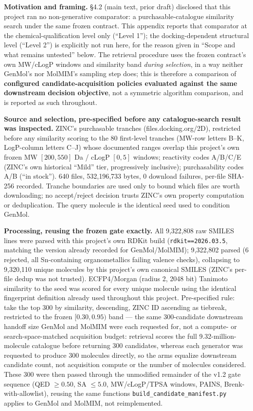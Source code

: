 \documentclass{article}
\begin{document}
\textbf{Motivation and framing.} \S4.2 (main text, prior draft) disclosed that this project ran no non-generative comparator: a purchasable-catalogue similarity search under the same frozen contract. This appendix reports that comparator at the chemical-qualification level only (``Level 1''); the docking-dependent structural level (``Level 2'') is explicitly not run here, for the reason given in ``Scope and what remains untested'' below. The retrieval procedure uses the frozen contract's own MW/cLogP windows and similarity band \emph{during selection}, in a way neither GenMol's nor MolMIM's sampling step does; this is therefore a comparison of \textbf{configured candidate-acquisition policies evaluated against the same downstream decision objective}, not a symmetric algorithm comparison, and is reported as such throughout.

\textbf{Source and selection, pre-specified before any catalogue-search result was inspected.} ZINC's purchasable tranches (files.docking.org/2D), restricted before any similarity scoring to the 80 first-level tranches (MW-row letters B--K, LogP-column letters C--J) whose documented ranges overlap this project's own frozen MW $[200,550]$ Da / cLogP $[0,5]$ windows; reactivity codes A/B/C/E (ZINC's own historical ``Mild'' tier, progressively inclusive); purchasability codes A/B (``in stock''). 640 files, 532{,}196{,}733 bytes, 0 download failures, per-file SHA-256 recorded. Tranche boundaries are used only to bound which files are worth downloading; no accept/reject decision trusts ZINC's own property computation or deduplication. The query molecule is the identical seed used to condition GenMol.

\textbf{Processing, reusing the frozen gate exactly.} All 9{,}322{,}808 raw SMILES lines were parsed with this project's own RDKit build (\texttt{rdkit==2026.03.5}, matching the version already recorded for GenMol/MolMIM); 9{,}322{,}802 parsed (6 rejected, all Sn-containing organometallics failing valence checks), collapsing to 9{,}320{,}110 unique molecules by this project's own canonical SMILES (ZINC's per-file dedup was not trusted). ECFP4/Morgan (radius 2, 2048 bit) Tanimoto similarity to the seed was scored for every unique molecule using the identical fingerprint definition already used throughout this project. Pre-specified rule: take the top 300 by similarity, descending, ZINC ID ascending as tiebreak, restricted to the frozen $[0.30,0.95)$ band --- the same 300-candidate downstream handoff size GenMol and MolMIM were each requested for, not a compute- or search-space-matched acquisition budget: retrieval scores the full 9.32-million-molecule catalogue before returning 300 candidates, whereas each generator was requested to produce 300 molecules directly, so the arms equalize downstream candidate count, not acquisition compute or the number of molecules considered. These 300 were then passed through the unmodified remainder of the v1.2 gate sequence (QED $\geq 0.50$, SA $\leq 5.0$, MW/cLogP/TPSA windows, PAINS, Brenk-with-allowlist), reusing the same functions \texttt{build\_candidate\_manifest.py} applies to GenMol and MolMIM, not reimplemented.
\end{document}
